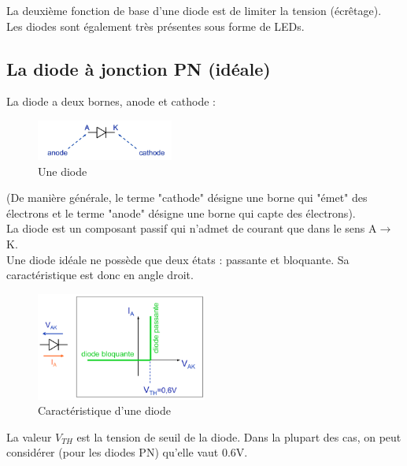 \documentclass[a4paper]{article}
\begin{document}
    La deuxième fonction de base d'une diode est de limiter la tension (écrêtage).\\

    Les diodes sont également très présentes sous forme de LEDs.

    \subsection{La diode à jonction PN (idéale)}
    La diode a deux bornes, anode et cathode :
    \begin{figure}[H]
        \begin{center}
            \includegraphics[width=0.4\textwidth]{fig/5_diode.png}
            \caption{Une diode}
            \label{fig:5_diode}
        \end{center}
    \end{figure}

    (De manière générale, le terme "cathode" désigne une borne qui "émet" des électrons
    et le terme "anode" désigne une borne qui capte des électrons).\\

    La diode est un composant passif qui n'admet de courant que dans le sens A$\rightarrow$K.\\

    Une diode idéale ne possède que deux états : passante et bloquante. Sa 
    caractéristique est donc en angle droit.
    \begin{figure}[H]
        \begin{center}
            \includegraphics[width=0.5\textwidth]{fig/5_diodecar.png}
            \caption{Caractéristique d'une diode}
            \label{fig:5_diodecar}
        \end{center}
    \end{figure}
    La valeur $V_{TH}$ est la tension de seuil de la diode. Dans la plupart des cas,
    on peut considérer (pour les diodes PN) qu'elle vaut 0.6V.
\end{document}
